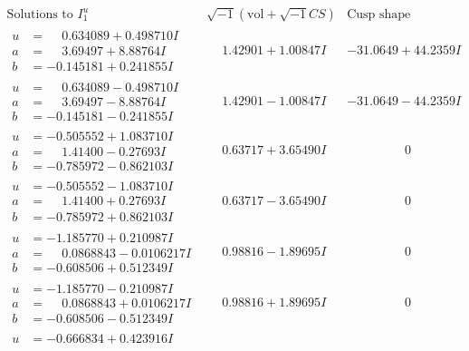 \documentclass[1p]{elsarticle_modified}
\theoremstyle{definition}
\newcommand{\I}{\sqrt{-1}}
\begin{document}
$$\begin{array}{c|c|c}
\text{Solutions to }I^u_{1}& \I (\text{vol} + \sqrt{-1}CS) & \text{Cusp shape}\\
 \hline 
\begin{aligned}
u &= \phantom{-}0.634089 + 0.498710 I \\
a &= \phantom{-}3.69497 + 8.88764 I \\
b &= -0.145181 + 0.241855 I\end{aligned}
 & \phantom{-}1.42901 + 1.00847 I & -31.0649 + 44.2359 I \\ \hline\begin{aligned}
u &= \phantom{-}0.634089 - 0.498710 I \\
a &= \phantom{-}3.69497 - 8.88764 I \\
b &= -0.145181 - 0.241855 I\end{aligned}
 & \phantom{-}1.42901 - 1.00847 I & -31.0649 - 44.2359 I \\ \hline\begin{aligned}
u &= -0.505552 + 1.083710 I \\
a &= \phantom{-}1.41400 - 0.27693 I \\
b &= -0.785972 - 0.862103 I\end{aligned}
 & \phantom{-}0.63717 + 3.65490 I & \phantom{-0.000000 } 0 \\ \hline\begin{aligned}
u &= -0.505552 - 1.083710 I \\
a &= \phantom{-}1.41400 + 0.27693 I \\
b &= -0.785972 + 0.862103 I\end{aligned}
 & \phantom{-}0.63717 - 3.65490 I & \phantom{-0.000000 } 0 \\ \hline\begin{aligned}
u &= -1.185770 + 0.210987 I \\
a &= \phantom{-}0.0868843 - 0.0106217 I \\
b &= -0.608506 + 0.512349 I\end{aligned}
 & \phantom{-}0.98816 - 1.89695 I & \phantom{-0.000000 } 0 \\ \hline\begin{aligned}
u &= -1.185770 - 0.210987 I \\
a &= \phantom{-}0.0868843 + 0.0106217 I \\
b &= -0.608506 - 0.512349 I\end{aligned}
 & \phantom{-}0.98816 + 1.89695 I & \phantom{-0.000000 } 0 \\ \hline\begin{aligned}
u &= -0.666834 + 0.423916 I \\

\end{aligned}
\end{array}$$
\end{document}
